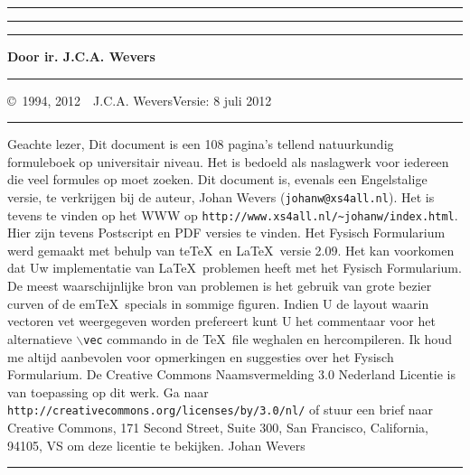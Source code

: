 \thispagestyle{empty}
\setcounter{page}{0}
\hrule
\rule{.4pt}{22.85cm}\hspace*{154mm}\rule{.4pt}{22.85cm}
\vspace*{-18cm}
\begin{center}
\Huge
{}
\end{center}
\vspace{2cm}
\centerline{\Large\bf Door ir. J.C.A. Wevers}
\vspace{2cm}
\vfill
\hrule
\newpage
\thispagestyle{empty}
\copyright~1994, 2012~~J.C.A. Wevers\hfill Versie: 8 juli 2012
\npar
\hrule
\par
\bigskip
Geachte lezer,
\npar
Dit document is een 108 pagina's tellend natuurkundig formuleboek op
universitair niveau. Het is bedoeld als naslagwerk voor iedereen die veel
formules op moet zoeken.
\npar
Dit document is, evenals een Engelstalige versie, te verkrijgen bij de
auteur, Johan Wevers\linebreak
({\tt johanw@xs4all.nl}).
\npar
Het is tevens te vinden op het WWW op {\tt http://www.xs4all.nl/\~{}johanw/index.html}.
Hier zijn tevens Postscript en PDF versies te vinden.
\npar
Het Fysisch Formularium werd gemaakt met behulp van te\TeX\ en \LaTeX\ versie 2.09.
\npar
Het kan voorkomen dat Uw implementatie van \LaTeX\ problemen heeft met het
Fysisch Formularium. De meest waarschijnlijke bron van problemen is het
gebruik van grote bezier curven of de em\TeX\ specials in sommige figuren.
Indien U de layout waarin vectoren vet weergegeven worden prefereert kunt U
het commentaar voor het alternatieve {\tt $\backslash$vec} commando in de
\TeX\ file weghalen en hercompileren.
\npar
Ik houd me altijd aanbevolen voor opmerkingen en suggesties over het Fysisch
Formularium.
\npar
De Creative Commons Naamsvermelding 3.0 Nederland Licentie is van toepassing op dit werk.
Ga naar {\tt http://creativecommons.org/licenses/by/3.0/nl/} of stuur een brief naar Creative Commons,
171 Second Street, Suite 300, San Francisco, California, 94105, VS om deze licentie te bekijken.
\npar
Johan Wevers
\vfill
\hrule
\newpage

\tableofcontents
\newpage


